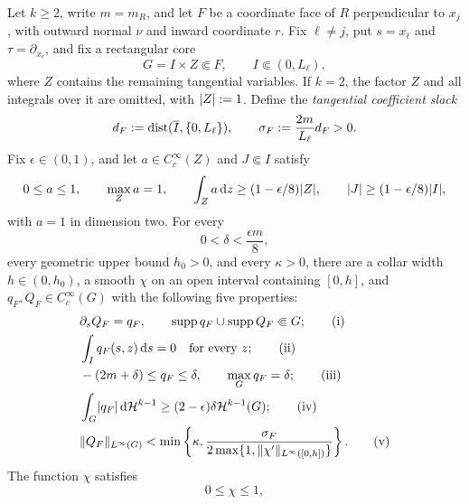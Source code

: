 \begin{collarlemma}
\label{lem:oscillatory-collar}
Let $k\ge2$, write $m=m_R$, and let $F$ be a coordinate face of $R$
perpendicular to $x_j$, with outward normal $\nu$ and inward coordinate $r$.
Fix $\ell\ne j$, put $s=x_\ell$ and $\tau=\partial_{x_\ell}$, and fix a
rectangular core
\[
 G=I\times Z\Subset F,
 \qquad I\Subset(0,L_\ell),
\]
where $Z$ contains the remaining tangential variables.  If $k=2$, the factor
$Z$ and all integrals over it are omitted, with $\lvert Z \rvert:=1$.  Define the
\emph{tangential coefficient slack}
\begin{equation}
\label{eq:tangential-coefficient-slack}
 d_F:=\operatorname{dist}(\overline I,\{0,L_\ell\}),
 \qquad
 \sigma_F:=\frac{2m}{L_\ell}d_F>0.
\end{equation}
Fix $\epsilon\in(0,1)$, and let $a\in C_c^\infty(Z)$ and $J\Subset I$
satisfy
\begin{equation}
\label{eq:z-cutoff-cost}
 0\le a\le1,
 \qquad \max_Za=1,
 \qquad \int_Za\,\mathrm{d} z\ge(1-\epsilon/8)\lvert Z \rvert,
 \qquad \lvert J \rvert\ge(1-\epsilon/8)\lvert I \rvert,
\end{equation}
with $a=1$ in dimension two.  For every
\begin{equation}
\label{eq:collar-delta-threshold}
 0<\delta<\frac{\epsilon m}{8},
\end{equation}
every geometric upper bound $h_0>0$, and every $\kappa>0$, there are a collar
width $h\in(0,h_0)$, a smooth $\chi$ on an open interval containing $[0,h]$,
and $q_F,Q_F\in C_c^\infty(G)$ with the following five properties:
\begin{align}
 &\partial_sQ_F=q_F,
 \qquad \operatorname{supp}q_F\cup\operatorname{supp}Q_F\Subset G;
 \tag{i}\label{eq:collar-signal-support}\\
 &\int_Iq_F(s,z)\,\mathrm{d} s=0
 \quad\text{for every }z;
 \tag{ii}\label{eq:collar-signal-fibre-mean}\\
 &-(2m+\delta)\le q_F\le\delta,
 \qquad \max_Gq_F=\delta;
 \tag{iii}\label{eq:boundary-signal-properties}\\
 &\int_G\lvert q_F \rvert\,\mathrm{d}\mathcal{H}^{k-1}
 \ge(2-\epsilon)\delta\mathcal{H}^{k-1}(G);
 \tag{iv}\label{eq:face-signal-mass}\\
 &\lVert Q_F \rVert_{L^\infty(G)}
 <\min\left\{\kappa,
 \frac{\sigma_F}{2\max\{1,\lVert \chi' \rVert_{L^\infty([0,h])}\}}\right\}.
 \tag{v}\label{eq:collar-primitive-bound}
\end{align}
The function $\chi$ satisfies
\begin{equation}
\label{eq:collar-cutoff-condition}
 0\le\chi\le1,

\end{equation}
\end{collarlemma}
